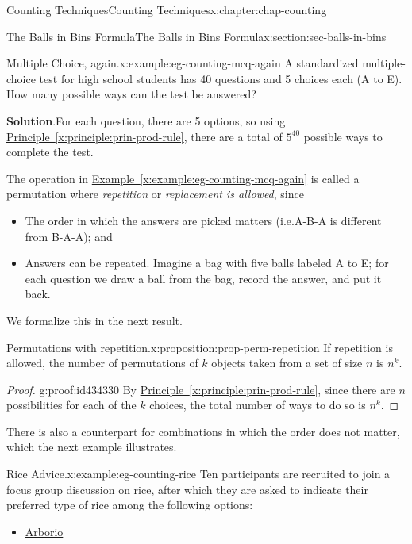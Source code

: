 \documentclass[oneside,10pt,]{book}
\newcommand{\blocktitlefont}{\relax}
\newcommand{\xreffont}{\relax}
\numberwithin{equation}{section}
\begin{document}
\begin{chapterptx}{Counting Techniques}{}{Counting Techniques}{}{}{x:chapter:chap-counting}
\begin{sectionptx}{The Balls in Bins Formula}{}{The Balls in Bins Formula}{}{}{x:section:sec-balls-in-bins}
\begin{example}{Multiple Choice, again.}{x:example:eg-counting-mcq-again}%
A standardized multiple-choice test for high school students has 40 questions and 5 choices each (A to E). How many possible ways can the test be answered?%
\par\smallskip%
\noindent\textbf{\blocktitlefont Solution}.\hypertarget{g:solution:id434316}{}\quad{}For each question, there are 5 options, so using \hyperref[x:principle:prin-prod-rule]{Principle~{\xreffont\ref{x:principle:prin-prod-rule}}}, there are a total of \(5^{40}\) possible ways to complete the test.%
\end{example}
The operation in \hyperref[x:example:eg-counting-mcq-again]{Example~{\xreffont\ref{x:example:eg-counting-mcq-again}}} is called a permutation where \emph{repetition} or \emph{replacement is allowed}, since%
\begin{itemize}[label=\textbullet]
\item{}The order in which the answers are picked matters (i.e.\@ A-B-A is different from B-A-A); and%
\item{}Answers can be repeated. Imagine a bag with five balls labeled A to E; for each question we draw a ball from the bag, record the answer, and put it back.%
\end{itemize}
We formalize this in the next result.%
\begin{proposition}{Permutations with repetition.}{}{x:proposition:prop-perm-repetition}%
If repetition is allowed, the number of permutations of \(k\) objects taken from a set of size \(n\) is \(n^k\).%
\end{proposition}
\begin{proof}{}{g:proof:id434330}
By \hyperref[x:principle:prin-prod-rule]{Principle~{\xreffont\ref{x:principle:prin-prod-rule}}}, since there are \(n\) possibilities for each of the \(k\) choices, the total number of ways to do so is \(n^k\).%
\end{proof}
There is also a counterpart for combinations in which the order does not matter, which the next example illustrates.%
\begin{example}{Rice Advice.}{x:example:eg-counting-rice}%
Ten participants are recruited to join a focus group discussion on rice, after which they are asked to indicate their preferred type of rice among the following options:%
\begin{itemize}[label=\textbullet]
\item{}\href{https://en.wikipedia.org/wiki/Arborio_rice}{Arborio}%

\end{itemize}
\end{example}
\end{sectionptx}
\end{chapterptx}
\end{document}
